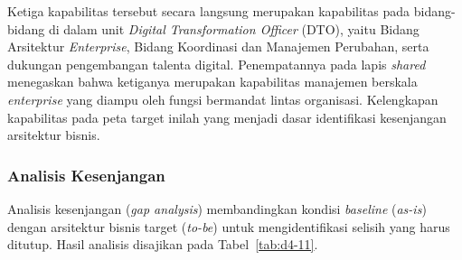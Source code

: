 Ketiga kapabilitas tersebut secara langsung merupakan kapabilitas pada bidang-bidang di dalam unit \textit{Digital Transformation Officer} (DTO), yaitu Bidang Arsitektur \textit{Enterprise}, Bidang Koordinasi dan Manajemen Perubahan, serta dukungan pengembangan talenta digital. Penempatannya pada lapis \textit{shared} menegaskan bahwa ketiganya merupakan kapabilitas manajemen berskala \textit{enterprise} yang diampu oleh fungsi bermandat lintas organisasi. Kelengkapan kapabilitas pada peta target inilah yang menjadi dasar identifikasi kesenjangan arsitektur bisnis.

\subsubsection{Analisis Kesenjangan}

Analisis kesenjangan (\textit{gap analysis}) membandingkan kondisi \textit{baseline} (\textit{as-is}) dengan arsitektur bisnis target (\textit{to-be}) untuk mengidentifikasi selisih yang harus ditutup. Hasil analisis disajikan pada Tabel~\ref{tab:d4-11}.

